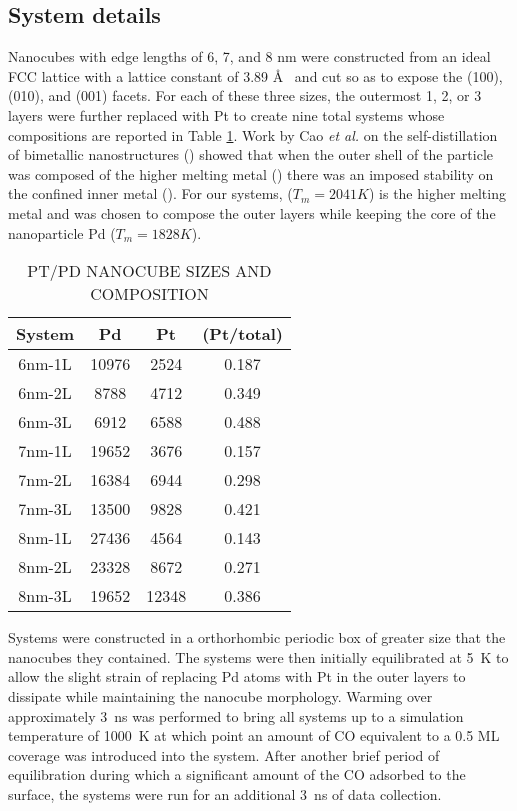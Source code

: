 \subsection{System details}
Nanocubes with edge lengths of 6, 7, and 8 nm were constructed from an ideal
 FCC lattice with a lattice constant of 3.89 \AA~  and cut so as to
expose the (100), (010), and (001) facets. For each of these three sizes, the
outermost 1, 2, or 3 layers were further replaced with Pt to create nine total
systems whose compositions are reported in Table \ref{tab:systems}. Work by Cao
{\it et al.}\citep{Cao:2010gf} on the self-distillation of bimetallic
nanostructures () showed that when the outer shell of the particle
was composed of the higher melting metal () there was an imposed stability on the
confined inner metal (). For our systems,  ($T_m = 2041 K$) is the higher melting
metal and was chosen to compose the outer layers while keeping the core of the
nanoparticle Pd ($T_m = 1828 K$). 

\begin{table}
  \caption{PT/PD NANOCUBE SIZES AND COMPOSITION}
  \centering
  \begin{threeparttable}
  \begin{tabular}{ c ccc }
  \hline
  \hline
  \textbf{System} & \textbf{Pd} & \textbf{Pt} &  \textbf{(Pt/total)} \\
  \hline
  6nm-1L & 10976 & 2524  & 0.187 \\
  6nm-2L & 8788  & 4712  & 0.349 \\
  6nm-3L & 6912  & 6588  & 0.488 \\
  7nm-1L & 19652 & 3676  & 0.157 \\
  7nm-2L & 16384 & 6944  & 0.298 \\
  7nm-3L & 13500 & 9828  & 0.421 \\
  8nm-1L & 27436 & 4564  & 0.143 \\
  8nm-2L & 23328 & 8672  & 0.271 \\
  8nm-3L & 19652 & 12348 & 0.386 \\
  \hline
  \hline
  \end{tabular}
  \end{threeparttable}
\label{tab:systems}
\end{table}

Systems were constructed in a orthorhombic periodic box of greater size that
the nanocubes they contained. The systems were then initially
equilibrated at 5~K to allow the slight strain of replacing Pd atoms with Pt in
the outer layers to dissipate while maintaining the nanocube morphology.
Warming over approximately 3~ns was performed to bring all systems up to a
simulation temperature of 1000~K at which point an amount of CO equivalent to a
0.5 ML coverage was introduced into the system.  After another brief period of
equilibration during which a significant amount of the CO adsorbed to the
surface, the systems were run for an additional 3~ns of
data collection.

